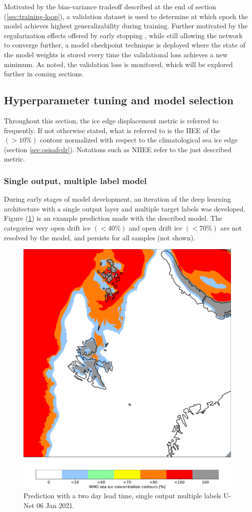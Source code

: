 \documentclass[../main/thesis]{subfiles}
\begin{document}
Motivated by the bias-variance tradeoff described at the end of section (\ref{sec:training-loop}), a validation dataset is used to determine at which epoch the model achieves highest generalizability during training. Further motivated by the regularization effects offered by early stopping \citep{Graves2013}, while still allowing the network to converge further, a model checkpoint technique is deployed where the state of the model weights is stored every time the validational loss achieves a new minimum. As noted, the validation loss is monitored, which will be explored further in coming sections.


\subsection{Hyperparameter tuning and model selection}
Throughout this section, the ice edge displacement metric is referred to frequently. If not otherwise stated, what is referred to is the IIEE of the $(> 10\%)$ contour normalized with respect to the climatological sea ice edge (section \ref{sec:osisafcdr}). Notations such as NIIEE refer to the just described metric. 

\subsubsection{Single output, multiple label model}
\label{sec:singleoutputmodel}
During early stages of model development, an iteration of the deep learning architecture with a single output layer and multiple target labels was developed. Figure (\ref{fig:singleoutmodel}) is an example prediction made with the described model. The categories very open drift ice $(<40\%)$ and open drift ice $(<70\%)$ are not resolved by the model, and persists for all samples (not shown). 

\begin{figure}
    \centering
    \includegraphics[width=.6\textwidth]{20210106}
    \caption{\label{fig:singleoutmodel}Prediction with a two day lead time, single output multiple labels U-Net 06 Jan 2021.}
\end{figure}
\end{document}
